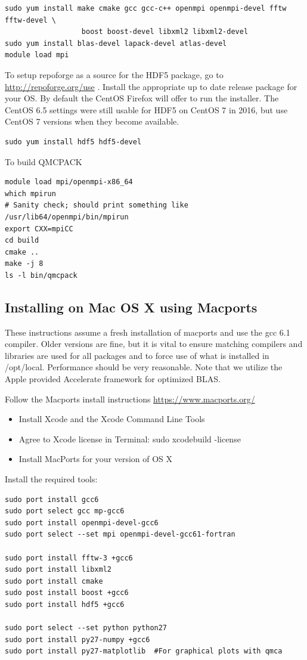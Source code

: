 \begin{verbatim}
sudo yum install make cmake gcc gcc-c++ openmpi openmpi-devel fftw fftw-devel \
                  boost boost-devel libxml2 libxml2-devel
sudo yum install blas-devel lapack-devel atlas-devel
module load mpi
\end{verbatim}

To setup repoforge as a source for the HDF5 package, go to
\url{http://repoforge.org/use} . Install the appropriate up to date
release package for your OS. By default the CentOS Firefox will offer
to run the installer. The CentOS 6.5 settings were still usable for HDF5 on
CentOS 7 in 2016, but use CentOS 7 versions when they become
available.

\begin{verbatim}
sudo yum install hdf5 hdf5-devel
\end{verbatim}

To build QMCPACK
\begin{verbatim}
module load mpi/openmpi-x86_64
which mpirun
# Sanity check; should print something like   /usr/lib64/openmpi/bin/mpirun
export CXX=mpiCC
cd build
cmake ..
make -j 8
ls -l bin/qmcpack
\end{verbatim}

\subsection{Installing on Mac OS X using Macports}
These instructions assume a fresh installation of macports
and use the gcc 6.1 compiler. Older versions are fine, but it is vital to ensure
matching compilers and libraries are used for all
packages and to force use of what is installed in /opt/local.  Performance should be very reasonable.
Note that we utilize the Apple provided Accelerate framework for
optimized BLAS.

Follow the Macports install instructions \url{https://www.macports.org/}

\begin{itemize}
\item Install Xcode and the Xcode Command Line Tools
\item Agree to Xcode license in Terminal: sudo xcodebuild -license
\item Install MacPorts for your version of OS X
\end{itemize}


Install the required tools:

\begin{verbatim}
sudo port install gcc6
sudo port select gcc mp-gcc6
sudo port install openmpi-devel-gcc6
sudo port select --set mpi openmpi-devel-gcc61-fortran

sudo port install fftw-3 +gcc6
sudo port install libxml2
sudo port install cmake
sudo post install boost +gcc6
sudo port install hdf5 +gcc6

sudo port select --set python python27
sudo port install py27-numpy +gcc6
sudo port install py27-matplotlib  #For graphical plots with qmca
\end{verbatim}

